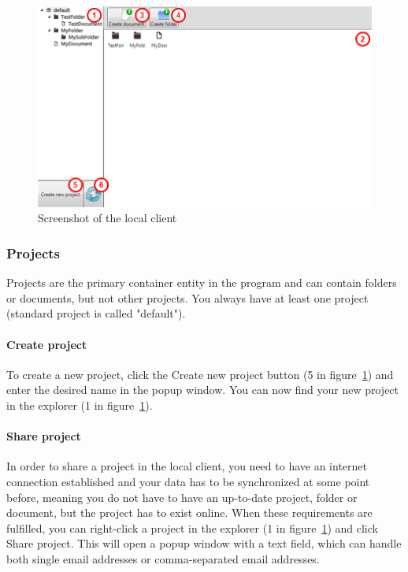 \begin{figure}[htb]
	\centering
	\includegraphics[width=1\textwidth]{User_manual/graphics/local.png}
	\caption{Screenshot of the local client}
	\label{fig:manual-local}
\end{figure}

\subsubsection{Projects}
Projects are the primary container entity in the program and can contain folders or documents, but not other projects. You always have at least one project (standard project is called "default").

	\paragraph{Create project}
	To create a new project, click the Create new project button (5 in figure~\ref{fig:manual-local}) and enter the desired name in the popup window. You can now find your new project in the explorer (1 in figure~\ref{fig:manual-local}).

	\paragraph{Share project}
	In order to share a project in the local client, you need to have an internet connection established and your data has to be synchronized at some point before, meaning you do not have to have an up-to-date project, folder or document, but the project has to exist online. When these requirements are fulfilled, you can right-click a project in the explorer (1 in figure~\ref{fig:manual-local}) and click Share project. This will open a popup window with a text field, which can handle both single email addresses or comma-separated email addresses.

